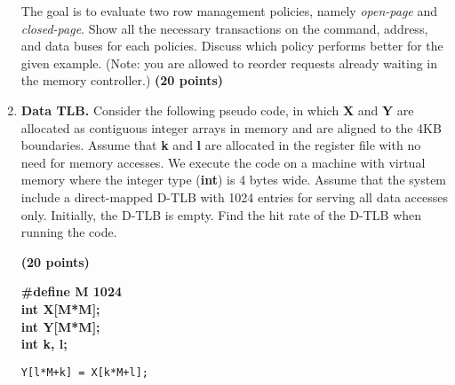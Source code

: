 \documentclass[a4paper, 11pt]{exam}
\begin{document}
\begin{enumerate}
The goal is to evaluate two row management policies, namely \textit{open-page} and \textit{closed-page}.
Show all the necessary transactions on the command, address, and data buses for each policies.
Discuss which policy performs better for the given example.
(Note: you are allowed to reorder requests already waiting in the memory controller.)
\textbf{(20 points)}
\begin{figure}[h!]
	\begin{center}
	\end{center}
\end{figure}


\item \textbf{Data TLB.}
Consider the following  pseudo code, in which \textbf{X} and \textbf{Y} are allocated as contiguous integer arrays in memory and are aligned to the 4KB boundaries.
Assume that \textbf{k} and \textbf{l} are allocated in the register file with no need for memory accesses.
We execute the code on a machine with virtual memory where the integer type (\textbf{int}) is 4 bytes wide.
Assume that the system include a direct-mapped D-TLB with 1024 entries for serving all data accesses only.
Initially, the D-TLB is empty.
Find the hit rate of the D-TLB when running the code.

\textbf{(20 points)}
\begin{algorithm}
	\textbf{\#define M 1024} \\
	\textbf{int X[M*M];} \\
	\textbf{int Y[M*M];} \\
	\textbf{int k, l;}
	\begin{algorithmic}	
		\STATE \texttt{Y[l*M+k] = X[k*M+l];}
		\ENDFOR
		\ENDFOR
	\end{algorithmic}
\end{algorithm}


\end{enumerate}
\end{document}

